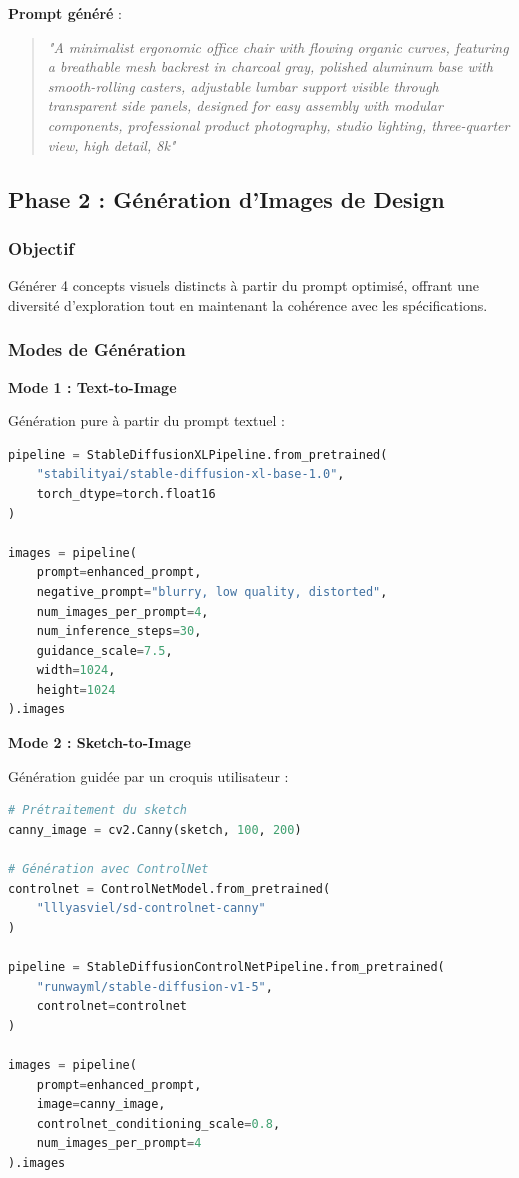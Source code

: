 \textbf{Prompt généré} :
\begin{quote}
\textit{"A minimalist ergonomic office chair with flowing organic curves, featuring a breathable mesh backrest in charcoal gray, polished aluminum base with smooth-rolling casters, adjustable lumbar support visible through transparent side panels, designed for easy assembly with modular components, professional product photography, studio lighting, three-quarter view, high detail, 8k"}
\end{quote}

\subsection{Phase 2 : Génération d'Images de Design}

\subsubsection{Objectif}

Générer 4 concepts visuels distincts à partir du prompt optimisé, offrant une diversité d'exploration tout en maintenant la cohérence avec les spécifications.

\subsubsection{Modes de Génération}

\textbf{Mode 1 : Text-to-Image}

Génération pure à partir du prompt textuel :

\begin{lstlisting}[language=Python, caption=Génération text-to-image]
pipeline = StableDiffusionXLPipeline.from_pretrained(
    "stabilityai/stable-diffusion-xl-base-1.0",
    torch_dtype=torch.float16
)

images = pipeline(
    prompt=enhanced_prompt,
    negative_prompt="blurry, low quality, distorted",
    num_images_per_prompt=4,
    num_inference_steps=30,
    guidance_scale=7.5,
    width=1024,
    height=1024
).images
\end{lstlisting}

\textbf{Mode 2 : Sketch-to-Image}

Génération guidée par un croquis utilisateur :

\begin{lstlisting}[language=Python, caption=Génération sketch-to-image avec ControlNet]
# Prétraitement du sketch
canny_image = cv2.Canny(sketch, 100, 200)

# Génération avec ControlNet
controlnet = ControlNetModel.from_pretrained(
    "lllyasviel/sd-controlnet-canny"
)

pipeline = StableDiffusionControlNetPipeline.from_pretrained(
    "runwayml/stable-diffusion-v1-5",
    controlnet=controlnet
)

images = pipeline(
    prompt=enhanced_prompt,
    image=canny_image,
    controlnet_conditioning_scale=0.8,
    num_images_per_prompt=4
).images
\end{lstlisting}

